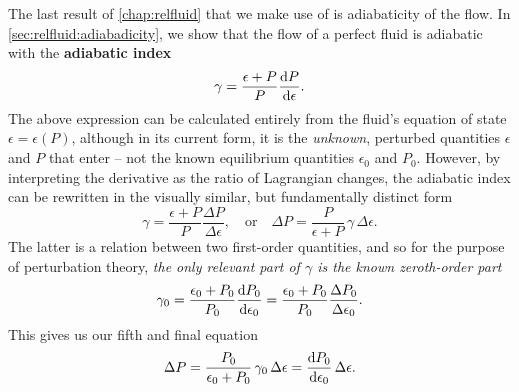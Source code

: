 The last result of \cref{chap:relfluid} that we make use of is adiabaticity of the flow.
In \cref{sec:relfluid:adiabadicity}, we show that the flow of a perfect fluid is adiabatic with the \textbf{adiabatic index}
\begin{equation}
	\gamma = \frac{\epsilon+P}{P} \odv{P}{\epsilon} .
\label{eq:nstars:adiabatic_index0}
\end{equation}
The above expression can be calculated entirely from the fluid's equation of state $\epsilon = \epsilon(P)$, although in its current form, it is the \emph{unknown}, perturbed quantities $\epsilon$ and $P$ that enter -- not the known equilibrium quantities $\epsilon_0$ and $P_0$.
However, by interpreting the derivative as the ratio of Lagrangian changes, the adiabatic index can be rewritten in the visually similar, but fundamentally distinct form
\begin{equation}
	\gamma = 
	\frac{\epsilon+P}{P} \frac{\Delta P}{\Delta \epsilon} ,
	\quad \text{or} \quad
	\Delta P = \frac{P}{\epsilon + P} \, \gamma \, \Delta \epsilon .
\label{eq:nstars:adiabatic_index}
\end{equation}
The latter is a relation between two first-order quantities, and so for the purpose of perturbation theory, \emph{the only relevant part of $\gamma$ is the known zeroth-order part}
\begin{equation}
	\gamma_0 = \frac{\epsilon_0+P_0}{P_0} \odv{P_0}{\epsilon_0}
	         = \frac{\epsilon_0+P_0}{P_0} \frac{\Delta P_0}{\Delta \epsilon_0} .
\end{equation}
This gives us our fifth and final equation
\begin{equation}
	\Delta P = \frac{P_0}{\epsilon_0 + P_0} \, \gamma_0 \, \Delta \epsilon
	         = \odv{P_0}{\epsilon_0} \, \Delta\epsilon .
\label{eq:nstars:Delta_P}
\end{equation}

